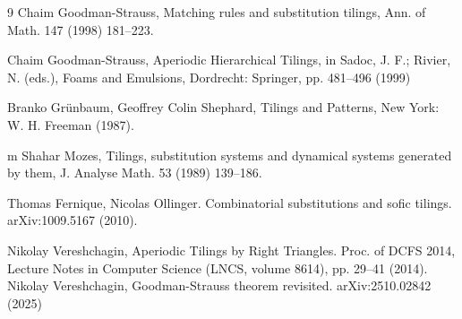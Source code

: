 \documentclass[12pt]{article}
\theoremstyle{remark}
\begin{document}
\begin{thebibliography}{9}
 Chaim Goodman-Strauss, Matching rules and substitution tilings, Ann. of Math. 147 (1998) 181–223.

 Chaim Goodman-Strauss, Aperiodic Hierarchical Tilings, in Sadoc, J. F.; Rivier, N. (eds.), Foams and Emulsions, Dordrecht: Springer, pp. 481–496 (1999)

  Branko Grünbaum, Geoffrey Colin Shephard, Tilings and Patterns, New York: W. H. Freeman (1987). 

\bibitem m Shahar Mozes, Tilings, substitution systems and dynamical systems generated by them, J. Analyse Math. 53 (1989) 139–186.

Thomas Fernique, Nicolas Ollinger. Combinatorial substitutions and sofic tilings.
 arXiv:1009.5167 (2010).

Nikolay Vereshchagin,
Aperiodic Tilings by Right Triangles.
Proc. of DCFS 2014, Lecture Notes in Computer Science (LNCS, volume 8614), pp. 29--41 (2014).
Nikolay Vereshchagin, Goodman-Strauss theorem revisited.
	arXiv:2510.02842 (2025)

\end{thebibliography}
\end{document}
